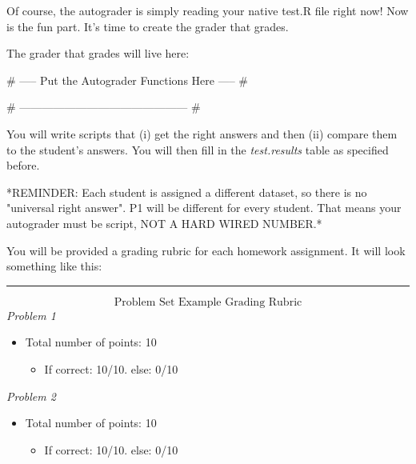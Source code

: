 \documentclass[
]{article}
\newenvironment{Shaded}{}{}
\newcommand{\CommentTok}[1]{\textcolor[rgb]{0.00,0.50,0.00}{#1}}
\providecommand{\tightlist}{%
  \setlength{\itemsep}{0pt}\setlength{\parskip}{0pt}}
\begin{document}
Of course, the autograder is simply reading your native test.R file
right now! Now is the fun part. It's time to create the grader that
grades.

The grader that grades will live here:

\hypertarget{numCode}{%
\label{numCode}}%
\begin{Shaded}
\begin{Highlighting}[numbers=left,,]
\CommentTok{# ----- Put the Autograder Functions Here ----- #}
    
 
    
\CommentTok{# --------------------------------------------- #}
\end{Highlighting}
\end{Shaded}

You will write scripts that (i) get the right answers and then (ii)
compare them to the student's answers. You will then fill in the
\emph{test.results} table as specified before.

\begin{center}
*REMINDER: Each student is assigned a different dataset, so there is no "universal right answer". P1 will be different for every student. That means your autograder must be script, NOT A HARD WIRED NUMBER.*
\end{center}

You will be provided a grading rubric for each homework assignment. It
will look something like this:

\begin{center}\rule{0.5\linewidth}{0.5pt}\end{center}

\[\text{Problem Set Example Grading Rubric}\] \emph{Problem 1}

\begin{itemize}
\item
  Total number of points: 10

  \begin{itemize}
  \tightlist
  \item
    If correct: 10/10. else: 0/10
  \end{itemize}
\end{itemize}

\emph{Problem 2}

\begin{itemize}
\item
  Total number of points: 10

  \begin{itemize}
  \tightlist
  \item
    If correct: 10/10. else: 0/10
  \end{itemize}
\end{itemize}
\end{document}
